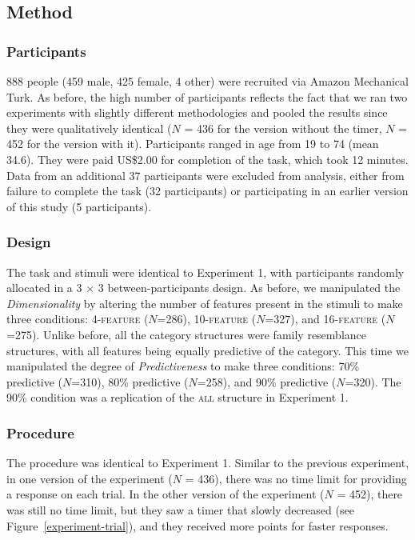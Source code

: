 \documentclass[a4paper, doc, floatsintext]{apa6}
\begin{document}
\subsection{Method}

\subsubsection{Participants}

888 people (459 male, 425 female, 4 other) were recruited via Amazon Mechanical Turk. As before, the high number of participants reflects the fact that we ran two experiments with slightly different methodologies and pooled the results since they were qualitatively identical ($N$ = 436 for the version without the timer, $N$ = 452 for the version with it). Participants ranged in age from 19 to 74 (mean 34.6). They were paid US\$2.00 for completion of the task, which took 12 minutes. Data from an additional 37 participants were excluded from analysis, either from failure to complete the task (32 participants) or participating in an earlier version of this study (5 participants).

\subsubsection{Design}

The task and stimuli were identical to Experiment 1, with participants randomly allocated in a 3 $\times$ 3 between-participants design. As before, we manipulated the \textit{Dimensionality} by altering the number of features present in the stimuli to make three conditions: 4-\textsc{feature} ($N$=286), 10-\textsc{feature} ($N$=327), and 16-\textsc{feature} ($N$=275). Unlike before, all the category structures were family resemblance structures, with all features being equally predictive of the category. This time we manipulated the degree of \textit{Predictiveness} to make three conditions: 70\% predictive ($N$=310), 80\% predictive ($N$=258), and 90\% predictive ($N$=320). The 90\% condition was a replication of the \textsc{all} structure in Experiment 1.

\subsubsection{Procedure}

The procedure was identical to Experiment 1. Similar to the previous experiment, in one version of the experiment ($N$ = 436), there was no time limit for providing a response on each trial. In the other version of the experiment ($N$ = 452), there was still no time limit, but they saw a timer that slowly decreased (see Figure~\ref{experiment-trial}), and they received more points for faster responses.
\end{document}

